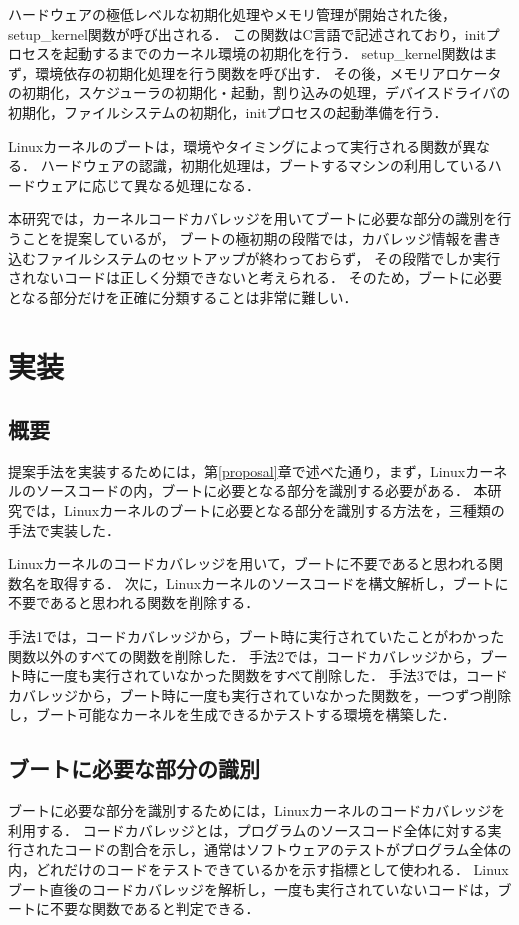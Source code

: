\documentclass[graduation-thesis]{mlarticle}
\begin{document}
ハードウェアの極低レベルな初期化処理やメモリ管理が開始された後，setup\_kernel関数が呼び出される．
この関数はC言語で記述されており，initプロセスを起動するまでのカーネル環境の初期化を行う．
setup\_kernel関数はまず，環境依存の初期化処理を行う関数を呼び出す．
その後，メモリアロケータの初期化，スケジューラの初期化・起動，割り込みの処理，デバイスドライバの初期化，ファイルシステムの初期化，initプロセスの起動準備を行う．

Linuxカーネルのブートは，環境やタイミングによって実行される関数が異なる．
ハードウェアの認識，初期化処理は，ブートするマシンの利用しているハードウェアに応じて異なる処理になる．

本研究では，カーネルコードカバレッジを用いてブートに必要な部分の識別を行うことを提案しているが，
ブートの極初期の段階では，カバレッジ情報を書き込むファイルシステムのセットアップが終わっておらず，
その段階でしか実行されないコードは正しく分類できないと考えられる．
そのため，ブートに必要となる部分だけを正確に分類することは非常に難しい．


\clearpage
\section{実装}
\label{implementation}
\subsection{概要}
\label{implementation:abstruction}
提案手法を実装するためには，第\ref{proposal}章で述べた通り，まず，Linuxカーネルのソースコードの内，ブートに必要となる部分を識別する必要がある．
本研究では，Linuxカーネルのブートに必要となる部分を識別する方法を，三種類の手法で実装した．

Linuxカーネルのコードカバレッジを用いて，ブートに不要であると思われる関数名を取得する．
次に，Linuxカーネルのソースコードを構文解析し，ブートに不要であると思われる関数を削除する．

手法1では，コードカバレッジから，ブート時に実行されていたことがわかった関数以外のすべての関数を削除した．
手法2では，コードカバレッジから，ブート時に一度も実行されていなかった関数をすべて削除した．
手法3では，コードカバレッジから，ブート時に一度も実行されていなかった関数を，一つずつ削除し，ブート可能なカーネルを生成できるかテストする環境を構築した．


\subsection{ブートに必要な部分の識別}
\label{implementation:boot}
ブートに必要な部分を識別するためには，Linuxカーネルのコードカバレッジを利用する．
コードカバレッジとは，プログラムのソースコード全体に対する実行されたコードの割合を示し，通常はソフトウェアのテストがプログラム全体の内，どれだけのコードをテストできているかを示す指標として使われる．
Linuxブート直後のコードカバレッジを解析し，一度も実行されていないコードは，ブートに不要な関数であると判定できる．
\end{document}
